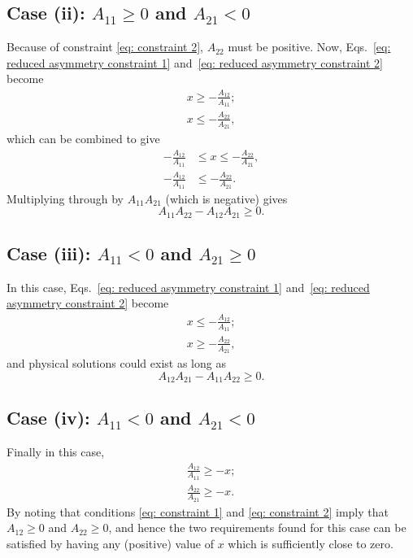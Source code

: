 \subsection*{Case (ii): $A_{11} \geq 0$ and $A_{21} < 0$}
Because of constraint \eqref{eq: constraint 2}, $A_{22}$ must be positive. Now, Eqs.~\eqref{eq: reduced asymmetry constraint 1} and~\eqref{eq: reduced asymmetry constraint 2} become
\begin{align}
    x \geq - \frac{A_{12}}{A_{11}}; \label{eq: case 2-1} \\ 
    x \leq - \frac{A_{22}}{A_{21}},\label{eq: case 2-2}
\end{align}
which can be combined to give
\begin{align}
    - \frac{A_{12}}{A_{11}} &\leq x \leq - \frac{A_{22}}{A_{21}},\\
    - \frac{A_{12}}{A_{11}} &\leq - \frac{A_{22}}{A_{21}}.
\end{align} 
Multiplying through by $A_{11}A_{21}$ (which is negative) gives
\begin{equation}
    A_{11}A_{22} -A_{12}A_{21} \geq 0.
\end{equation}

\subsection*{Case (iii): $A_{11} < 0$ and $A_{21} \geq 0$}
In this case, Eqs.~\eqref{eq: reduced asymmetry constraint 1} and~\eqref{eq: reduced asymmetry constraint 2} become
\begin{align}
    x \leq - \frac{A_{12}}{A_{11}}; \label{eq: case 3-1}\\
    x \geq - \frac{A_{22}}{A_{21}},\label{eq: case 3-2}
\end{align}
and physical solutions could exist as long as
\begin{equation}
    A_{12}A_{21} -A_{11}A_{22} \geq 0.
\end{equation}

\subsection*{Case (iv): $A_{11} < 0$ and $A_{21} < 0$}
Finally in this case,
\begin{align}
    \frac{A_{12}}{A_{11}} \ge - x; \label{eq: case 4-1}\\
    \frac{A_{22}}{A_{21}} \geq -x. \label{eq: case 4-2}
\end{align}
By noting that conditions \eqref{eq: constraint 1} and \eqref{eq: constraint 2} imply that $A_{12} \geq 0$ and $A_{22} \geq 0$, and hence the two requirements found for this case can be satisfied by having any (positive) value of $x$ which is sufficiently close to zero.

